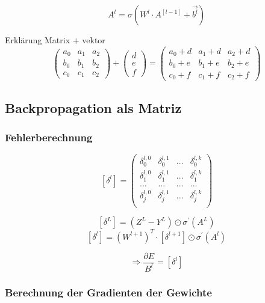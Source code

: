 \documentclass{article}
\begin{document}
 \[ A^l = \sigma (W^l \cdot A^{[l-1]} + \vec{b^l}) \]

Erklärung Matrix $+$ vektor
 \[ \begin{pmatrix}
    a_0 & a_1 & a_2 \\
    b_0 & b_1 & b_2 \\
    c_0 & c_1 & c_2
 \end{pmatrix} 
 + \begin{pmatrix}
    d \\ e \\ f
 \end{pmatrix} 
 = \begin{pmatrix}
    a_0 + d & a_1 + d & a_2 + d\\
    b_0 + e & b_1 + e & b_2 + e \\
    c_0 + f & c_1 + f & c_2 + f
 \end{pmatrix}\]


 \subsection{Backpropagation als Matriz}

 \subsubsection{Fehlerberechnung}

 \[ [\delta^l] =
 \begin{pmatrix}
    \delta_0^{l,0} & \delta_0^{l,1} & ... & \delta_0^{l,k} \\
    \delta_1^{l,0} & \delta_1^{l,1} & ... & \delta_1^{l,k} \\
    ... & ... & ... & ... \\
    \delta_j^{l,0} & \delta_j^{l,1} & ... & \delta_j^{l,k} \\
 \end{pmatrix} \]

  \[ [\delta^L] = (Z^L - Y^L) \odot \sigma^{\prime}(A^L) \]
 \[ [\delta^l] = (W^{l+1})^T \cdot [\delta^{l+1}] \odot \sigma^{\prime}(A^l) \]

 \[ \Rightarrow  \frac{\partial E}{B^l} = [\delta^l]\]


\pagebreak


 \subsubsection{Berechnung der Gradienten der Gewichte}
\end{document}
